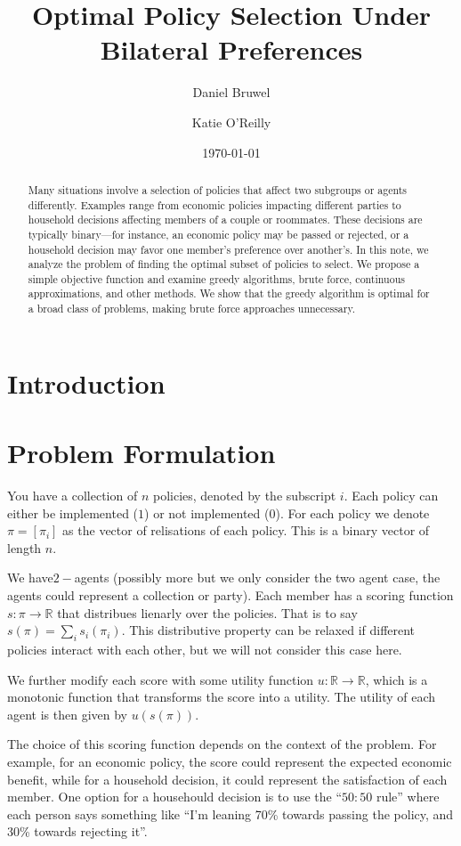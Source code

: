 \documentclass[11pt]{article}
\title{Optimal Policy Selection Under Bilateral Preferences}
\author{Daniel Bruwel \and Katie O'Reilly}
\date{\today}
\begin{document}
\maketitle

\begin{abstract}
Many situations involve a selection of policies that affect two subgroups or agents differently. Examples range from economic policies impacting different parties to household decisions affecting members of a couple or roommates. These decisions are typically binary—for instance, an economic policy may be passed or rejected, or a household decision may favor one member’s preference over another’s. In this note, we analyze the problem of finding the optimal subset of policies to select. We propose a simple objective function and examine greedy algorithms, brute force, continuous approximations, and other methods. We show that the greedy algorithm is optimal for a broad class of problems, making brute force approaches unnecessary.
\end{abstract}

\section{Introduction}
\cite{chvatal1979greedy}

\section{Problem Formulation}
You have a collection of $n$ policies, denoted by the subscript $i$. Each policy can either be implemented ($1$) or not implemented ($0$). For each policy we denote $\pi=[\pi_i]$ as the vector of relisations of each policy. This is a binary vector of length $n$.

We have$2-$agents (possibly more but we only consider the two agent case, the agents could represent a collection or party). Each member has a scoring function $s:\pi\to\mathbb{R}$ that distribues lienarly over the policies. That is to say $s(\pi)=\sum_i s_i(\pi_i)$. This distributive property can be relaxed if different policies interact with each other, but we will not consider this case here.

We further modify each score with some utility function $u:\mathbb{R}\to\mathbb{R}$, which is a monotonic function that transforms the score into a utility. The utility of each agent is then given by $u(s(\pi))$.

The choice of this scoring function depends on the context of the problem. For example, for an economic policy, the score could represent the expected economic benefit, while for a household decision, it could represent the satisfaction of each member. One option for a househould decision is to use the ``$50:50$ rule'' where each person says something like ``I'm leaning 70\% towards passing the policy, and 30\% towards rejecting it''.
\end{document}
